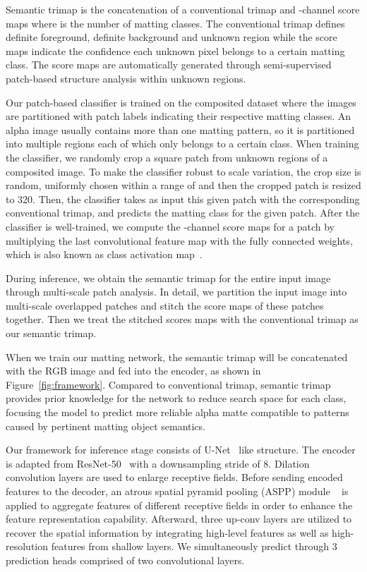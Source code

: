 \documentclass[10pt,twocolumn,letterpaper]{article}
\begin{document}
\vspace{2pt}
Semantic trimap is the concatenation of a conventional trimap and -channel score maps where  is the number of matting classes. The  conventional trimap defines definite foreground, definite background and unknown region while the score maps indicate the confidence each unknown pixel belongs to a certain matting class. The score maps are automatically generated through semi-supervised patch-based structure analysis within unknown regions. 

Our patch-based classifier is trained on the composited dataset where the images are partitioned with patch labels  indicating their respective matting classes. 
An alpha image usually contains more than one matting pattern, so it is partitioned into multiple regions each of which only belongs to a certain class. 
When training the classifier, we randomly crop a square patch  from unknown regions of a composited image. To make the classifier robust to scale variation, the crop size is random, uniformly chosen within a range of  and then the cropped patch is resized to 320. Then, the classifier takes as input this given patch with the corresponding conventional trimap, and predicts the matting class for the given patch. 
After the classifier is well-trained, we compute the -channel score maps for a patch by multiplying the last convolutional feature map with the fully connected weights, which is also known as class activation map~\cite{zhou2016cvpr}.

During inference, we obtain the semantic trimap for the entire input image through multi-scale patch analysis. In detail, we partition the input image into multi-scale overlapped patches and stitch the score maps of these patches together. Then we treat the stitched scores maps with the conventional trimap as our semantic trimap.

When we train our matting network, the semantic trimap will be concatenated with the RGB image and fed into the encoder, as shown in Figure~\ref{fig:framework}. Compared to conventional trimap, semantic trimap provides prior knowledge for the network to reduce search space for each class, focusing the model to predict more reliable alpha matte compatible to patterns caused by pertinent matting object semantics.

\vspace{4pt}
 Our framework for inference stage consists of U-Net~\cite{ronneberger2015u} like structure. The encoder is adapted from ResNet-50~\cite{he2016deep} with a downsampling stride of 8. Dilation convolution layers are used to enlarge receptive fields. Before sending encoded features to the decoder, an atrous spatial pyramid pooling (ASPP) module ~\cite{chen2017rethinking} is applied to aggregate features of different receptive fields in order to enhance the feature representation capability. Afterward, three up-conv layers are utilized to recover the spatial information by integrating high-level features as well as  high-resolution features from shallow layers. We simultaneously predict  through 3 prediction heads comprised of two  convolutional layers. 
\end{document}
